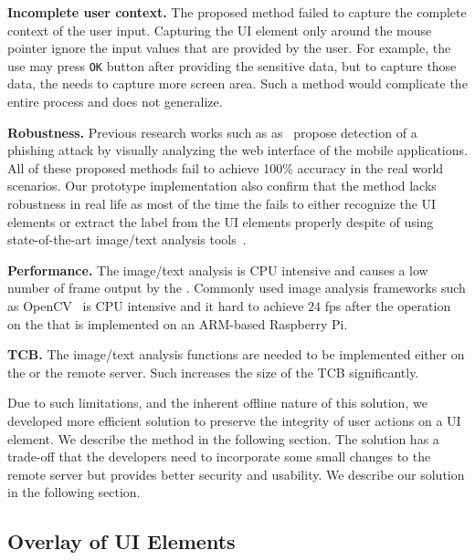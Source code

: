 \begin{mylist}
  \item \textbf{Incomplete user context.} The proposed method failed to capture the complete context of the user input. Capturing the UI element only around the mouse pointer ignore the input values that are provided by the user. For example, the use may press \texttt{OK} button after providing the sensitive data, but to capture those data, the \device needs to capture more screen area. Such a method would complicate the entire process and does not generalize.
  \item \textbf{Robustness.} Previous research works such as as~\cite{lukaSpoof,Chen:2010:DVS:1754393.1754394} propose detection of a phishing attack by visually analyzing the web interface of the mobile applications. All of these proposed methods fail to achieve 100\% accuracy in the real world scenarios. Our prototype implementation also confirm that the method lacks robustness in real life as most of the time the \device fails to either recognize the UI elements or extract the label from the UI elements properly despite of using state-of-the-art image/text analysis tools~\cite{opencv}.
  \item \textbf{Performance.} The image/text analysis is CPU intensive and causes a low number of frame output by the \device. Commonly used image analysis frameworks such as OpenCV~\cite{opencv} is CPU intensive and it hard to achieve $24$ fps after the operation on the \device that is implemented on an ARM-based Raspberry Pi.
  \item \textbf{TCB.} The image/text analysis functions are needed to be implemented either on the \device or the remote server. Such increases the size of the TCB significantly.
\end{mylist}

Due to such limitations, and the inherent offline nature of this solution, we developed more efficient solution to preserve the integrity of user actions on a UI element. We describe the method in the following section. The solution has a trade-off that the developers need to incorporate some small changes to the remote server but provides better security and usability. We describe our solution in the following section.



\subsection{\device Overlay of UI Elements}
\label{sec:systemDesign:transformation}

